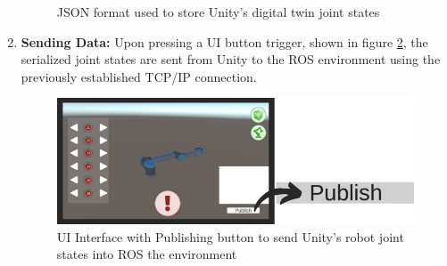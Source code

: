 \begin{enumerate}
\begin{figure}[htbp]
            \caption{JSON format used to store Unity's digital twin joint states}
            \label{fig:json_pub}
            \end{figure}
        \item \textbf{Sending Data:} Upon pressing a UI button trigger, shown in figure \ref{fig:publish_UI_button}, the serialized joint states are sent from Unity to the ROS environment using the previously established TCP/IP connection.
            \begin{figure}[htpb]
                \centering
                \includegraphics[width=0.8\linewidth]{figs/UI_Publish.png}
                \caption{UI Interface with Publishing button to send Unity's robot joint states into ROS the environment}
                \label{fig:publish_UI_button}
            \end{figure}
        
    \end{enumerate}
    
